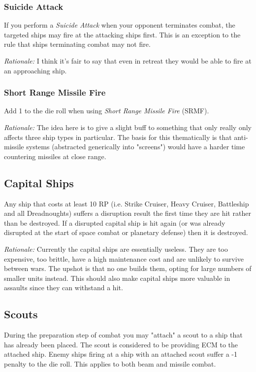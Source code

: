 \subsubsection{Suicide Attack}

If you perform a \textit{Suicide Attack} when your opponent terminates combat, the targeted ships may fire at the attacking ships first. This is an exception to the rule that ships terminating combat may not fire.

\textit{Rationale:} I think it's fair to say that even in retreat they would be able to fire at an approaching ship.

\subsubsection{Short Range Missile Fire}

Add 1 to the die roll when using \textit{Short Range Missile Fire} (SRMF).

\textit{Rationale:} The idea here is to give a slight buff to something that only really only affects three ship types in particular. The basis for this thematically is that anti-missile systems (abstracted generically into "screens") would have a harder time countering missiles at close range.

\subsection{Capital Ships}

Any ship that costs at least 10 RP (i.e. Strike Cruiser, Heavy Cruiser, Battleship and all Dreadnoughts) suffers a disruption result the first time they are hit rather than be destroyed. If a disrupted capital ship is hit again (or was already disrupted at the start of space combat or planetary defense) then it is destroyed.

\textit{Rationale:} Currently the capital ships are essentially useless. They are too expensive, too brittle, have a high maintenance cost and are unlikely to survive between wars. The upshot is that no one builds them, opting for large numbers of smaller units instead. This should also make capital ships more valuable in assaults since they can withstand a hit.

\subsection{Scouts}

During the preparation step of combat you may "attach" a scout to a ship that has already been placed. The scout is considered to be providing ECM to the attached ship. Enemy ships firing at a ship with an attached scout suffer a -1 penalty to the die roll. This applies to both beam and missile combat.

